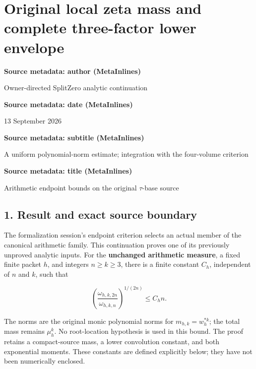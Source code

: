 \documentclass[11pt,a4paper]{article}
\begin{document}
\endgroup

\clearpage
\begingroup


\setcounter{equation}{0}
\renewcommand{\theequation}{ZLM.\arabic{equation}}
\section*{Original local zeta mass and complete three-factor lower envelope}
\textbf{Source metadata: author (MetaInlines)}

Owner-directed SplitZero analytic continuation

\textbf{Source metadata: date (MetaInlines)}

13 September 2026

\textbf{Source metadata: subtitle (MetaInlines)}

A uniform polynomial-norm estimate; integration with the four-volume criterion

\textbf{Source metadata: title (MetaInlines)}

Arithmetic endpoint bounds on the original \(\tau\)-base source

\subsection{1. Result and exact source boundary}\label{zlm:endpoint-arithmetic_original--result-and-exact-source-boundary}

The formalization session's endpoint criterion selects an actual member of the canonical arithmetic family. This continuation proves one of its previously unproved analytic inputs. For the \textbf{unchanged arithmetic measure}, a fixed finite packet \(h\), and integers \(n\ge k\ge3\), there is a finite constant \(C_h\), independent of \(n\) and \(k\), such that

\[
 \boxed{\left(\frac{\omega_{h,k,2n}}{\omega_{h,k,n}}\right)^{1/(2n)}
       \le C_h n.}                                                    \tag{1}
\]

The norms are the original monic polynomial norms for \(m_{h,k}=w_h^{*k}\); the total mass remains \(\mu_h^k\). No root-location hypothesis is used in this bound. The proof retains a compact-source mass, a lower convolution constant, and both exponential moments. These constants are defined explicitly below; they have not been numerically enclosed.
\end{document}
